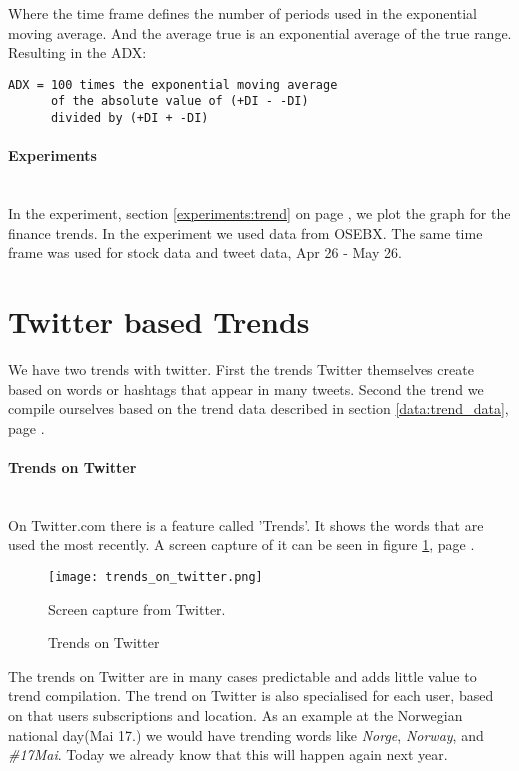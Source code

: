 Where the time frame defines the number of periods used in the exponential
moving average. And the average true is an exponential average of the true
range. Resulting in the ADX:
\begin{verbatim}
ADX = 100 times the exponential moving average 
      of the absolute value of (+DI - -DI) 
      divided by (+DI + -DI)
\end{verbatim}
%

\paragraph{Experiments}
\hspace{0pt}\\
In the experiment, section \ref{experiments:trend} on page
\pageref{experiments:trend}, we plot the graph for
the finance trends. In the experiment we used data from OSEBX. The same time
frame was used for stock data and tweet data, Apr 26 - May 26.
%

\section{Twitter based Trends}\label{trend:trends_on_twitter}
We have two trends with twitter. First the trends Twitter themselves
create based on words or hashtags that appear in many tweets. Second the trend we
compile ourselves based on the trend data described in section
\ref{data:trend_data}, page \pageref{data:trend_data}. 

\paragraph{Trends on Twitter}
\hspace{0pt}\\
On Twitter.com there is a feature called 'Trends'. It shows the words that are
used the most recently. A screen capture of it can be seen in figure
\ref{fig:trends_on_twitter}, page \pageref{fig:trends_on_twitter}.

\begin{figure}[htb]
	\centering
    \texttt{[image: trends\_on\_twitter.png]}
    \label{fig:trends_on_twitter}
    \caption{Trends on Twitter}
Screen capture from Twitter.
\end{figure}

The trends on Twitter are in many cases predictable and adds little value to trend
compilation. The trend on Twitter is also specialised for each user, based on
that users subscriptions and location. As an example at the Norwegian national
day(Mai 17.) we would have trending words like \textit{Norge}, \textit{Norway},
and \textit{\#17Mai}. Today we already know that this will happen again next year. 
%

